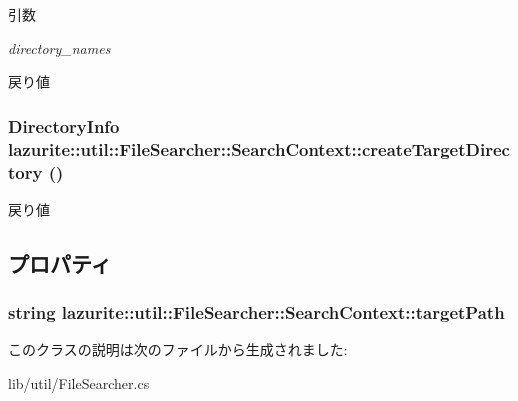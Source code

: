 \begin{DoxyParams}{引数}
\item[{\em directory\_\-names}]\end{DoxyParams}
\begin{DoxyReturn}{戻り値}

\end{DoxyReturn}
\hypertarget{classlazurite_1_1util_1_1_file_searcher_1_1_search_context_a5582c83de74c7c4b8fbe6723d65e5aec}{
\subsubsection[{createTargetDirectory}]{\setlength{\rightskip}{0pt plus 5cm}DirectoryInfo lazurite::util::FileSearcher::SearchContext::createTargetDirectory ()}}
\label{classlazurite_1_1util_1_1_file_searcher_1_1_search_context_a5582c83de74c7c4b8fbe6723d65e5aec}
\begin{DoxyReturn}{戻り値}

\end{DoxyReturn}


\subsection{プロパティ}
\hypertarget{classlazurite_1_1util_1_1_file_searcher_1_1_search_context_a2c040084d8fb7be87c9e4c0ada56c904}{
\subsubsection[{targetPath}]{\setlength{\rightskip}{0pt plus 5cm}string lazurite::util::FileSearcher::SearchContext::targetPath}}
\label{classlazurite_1_1util_1_1_file_searcher_1_1_search_context_a2c040084d8fb7be87c9e4c0ada56c904}


このクラスの説明は次のファイルから生成されました:\begin{DoxyCompactItemize}
\item 
lib/util/FileSearcher.cs\end{DoxyCompactItemize}
